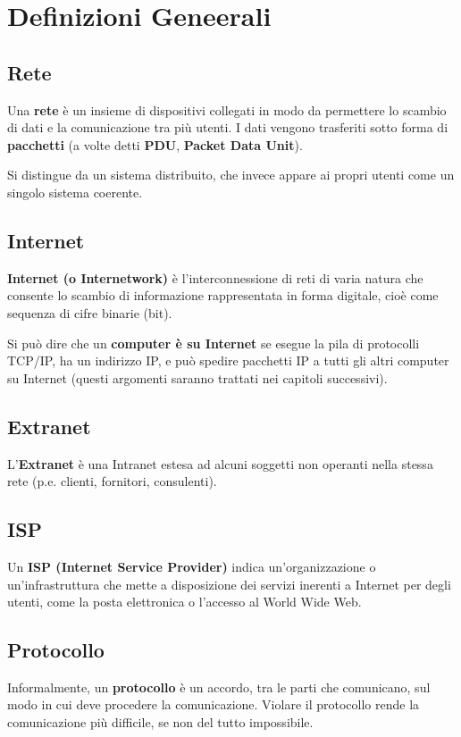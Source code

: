 \section{Definizioni Geneerali}
        \subsection{Rete}
        Una \textbf{rete} è un insieme di dispositivi collegati in modo da permettere lo scambio di dati e la
        comunicazione tra più utenti. I dati vengono trasferiti sotto forma di \textbf{pacchetti} (a volte detti
        \textbf{PDU}, \textbf{Packet Data Unit}).\newline
        
        Si distingue da un sistema distribuito, che invece appare ai propri utenti come un singolo
        sistema coerente.

        \subsection{Internet}
        \textbf{Internet (o Internetwork)} è l’interconnessione di reti di varia natura che consente lo scambio
        di informazione rappresentata in forma digitale, cioè come sequenza di cifre binarie (bit).\newline

        Si può dire che un \textbf{computer è su Internet} se esegue la pila di protocolli TCP/IP, ha un indirizzo
        IP, e può spedire pacchetti IP a tutti gli altri computer su Internet (questi argomenti saranno
        trattati nei capitoli successivi).

        \subsection{Extranet}
        L’\textbf{Extranet} è una Intranet estesa ad alcuni soggetti non operanti nella stessa rete (p.e. clienti,
        fornitori, consulenti).

        \subsection{ISP}
        Un \textbf{ISP (Internet Service Provider)} indica un’organizzazione o un’infrastruttura che mette a
        disposizione dei servizi inerenti a Internet per degli utenti, come la posta elettronica o l’accesso
        al World Wide Web.

        \subsection{Protocollo}
        Informalmente, un \textbf{protocollo} è un accordo, tra le parti che comunicano, sul modo in cui deve
        procedere la comunicazione. Violare il protocollo rende la comunicazione più difficile, se non
        del tutto impossibile.\newline

